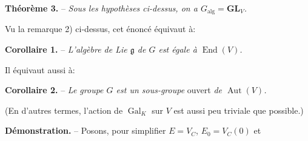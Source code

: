 \textbf{Théorème 3.} -- \textit{Sous les hypothèses ci-dessus, on a $G_{\mathrm{alg}}=\mathbf{GL}_V$.}

Vu la remarque 2) ci-dessus, cet énoncé équivaut à:

\textbf{Corollaire 1.} -- \textit{L’algèbre de Lie $\mathfrak{g}$ de $G$ est égale à $\operatorname{End}(V)$.}

Il équivaut aussi à:

\textbf{Corollaire 2.} -- \textit{Le groupe $G$ est un sous-groupe} ouvert \textit{de $\operatorname{Aut}(V)$.}

(En d’autres termes, l’action de $\operatorname{Gal}_K$ sur $V$ est aussi peu triviale que possible.)

\textbf{Démonstration.} -- Posons, pour simplifier $E=V_C$, $E_0=V_C(0)$ et
